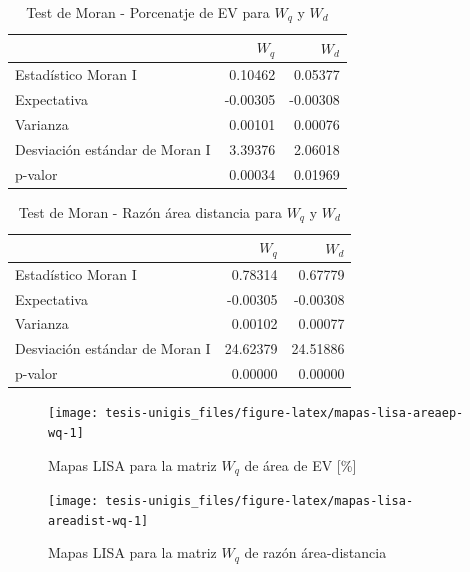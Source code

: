 \documentclass[12pt,a4paper,openany]{book}
\theoremstyle{definition}
\theoremstyle{definition}
\theoremstyle{definition}
\theoremstyle{remark}
\begin{document}
\begin{table}[H]

\caption{\label{tab:moran-areaep-w}Test de Moran - Porcenatje de EV para $W_q$ y $W_d$}
\centering
\begin{tabular}{lrr}
\toprule
  & $W_q$ & $W_d$\\
\midrule
Estadístico Moran I & 0.10462 & 0.05377\\
Expectativa & -0.00305 & -0.00308\\
Varianza & 0.00101 & 0.00076\\
Desviación estándar de Moran I & 3.39376 & 2.06018\\
p-valor & 0.00034 & 0.01969\\
\bottomrule
\end{tabular}
\end{table}

\begin{table}[H]

\caption{\label{tab:moran-areadist-w}Test de Moran - Razón área distancia para $W_{q}$ y $W_{d}$}
\centering
\begin{tabular}{lrr}
\toprule
  & $W_{q}$ & $W_{d}$\\
\midrule
Estadístico Moran I & 0.78314 & 0.67779\\
Expectativa & -0.00305 & -0.00308\\
Varianza & 0.00102 & 0.00077\\
Desviación estándar de Moran I & 24.62379 & 24.51886\\
p-valor & 0.00000 & 0.00000\\
\bottomrule
\end{tabular}
\end{table}

\begin{figure}[H]

{\centering \texttt{[image: tesis-unigis\_files/figure-latex/mapas-lisa-areaep-wq-1]} 

}

\caption{Mapas LISA para la matriz $W_q$ de área de EV [\%]}\label{fig:mapas-lisa-areaep-wq}
\end{figure}

\begin{figure}[H]

{\centering \texttt{[image: tesis-unigis\_files/figure-latex/mapas-lisa-areadist-wq-1]} 

}

\caption{Mapas LISA para la matriz $W_q$ de razón área-distancia}\label{fig:mapas-lisa-areadist-wq}
\end{figure}
\end{document}
